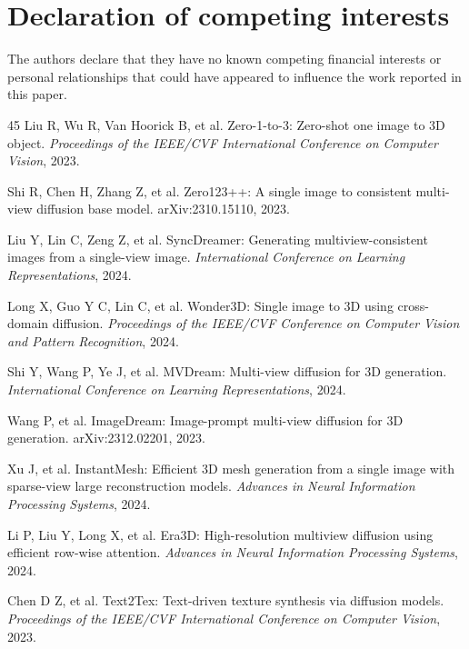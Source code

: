 \documentclass[times,twocolumn,final]{elsarticle}
\begin{document}
\section*{Declaration of competing interests}

The authors declare that they have no known competing financial interests or personal relationships that could have appeared to influence the work reported in this paper.


\begingroup
\linespread{0.94}\selectfont
\begin{thebibliography}{45}
Liu R, Wu R, Van Hoorick B, et al. Zero-1-to-3: Zero-shot one image to 3D object. \textit{Proceedings of the IEEE/CVF International Conference on Computer Vision}, 2023.

Shi R, Chen H, Zhang Z, et al. Zero123++: A single image to consistent multi-view diffusion base model. arXiv:2310.15110, 2023.

Liu Y, Lin C, Zeng Z, et al. SyncDreamer: Generating multiview-consistent images from a single-view image. \textit{International Conference on Learning Representations}, 2024.

Long X, Guo Y C, Lin C, et al. Wonder3D: Single image to 3D using cross-domain diffusion. \textit{Proceedings of the IEEE/CVF Conference on Computer Vision and Pattern Recognition}, 2024.

Shi Y, Wang P, Ye J, et al. MVDream: Multi-view diffusion for 3D generation. \textit{International Conference on Learning Representations}, 2024.

Wang P, et al. ImageDream: Image-prompt multi-view diffusion for 3D generation. arXiv:2312.02201, 2023.

Xu J, et al. InstantMesh: Efficient 3D mesh generation from a single image with sparse-view large reconstruction models. \textit{Advances in Neural Information Processing Systems}, 2024.

Li P, Liu Y, Long X, et al. Era3D: High-resolution multiview diffusion using efficient row-wise attention. \textit{Advances in Neural Information Processing Systems}, 2024.

Chen D Z, et al. Text2Tex: Text-driven texture synthesis via diffusion models. \textit{Proceedings of the IEEE/CVF International Conference on Computer Vision}, 2023.


\end{thebibliography}
\end{document}
